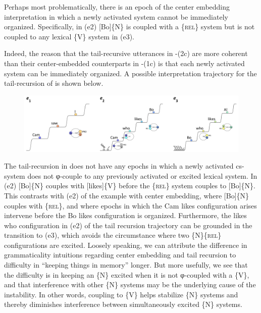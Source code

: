   Perhaps most problematically, there is an epoch of the center embedding interpretation in which a newly activated system cannot be immediately organized. Specifically, in (e2) [Bo]\{N\} is coupled with a \{\textsc{rel}\} system but is not coupled to any lexical \{V\} system in (e3). 

  Indeed, the reason that the tail-recursive utterances in -(2c) are more coherent than their center-embedded counterparts in -(1c) is that each newly activated system can be immediately organized. A possible interpretation trajectory for the tail-recursion of  is shown below. 

  
\begin{figure}
\includegraphics[width=\textwidth]{figures/Tilsen-img133.png}
\caption{\missingcaption}
\label{fig:6:14}
\end{figure}
 

  The tail-recursion in  does not have any epochs in which a newly activated cs-system does not φ-couple to any previously activated or excited lexical system. In (e2) [Bo]\{N\} couples with [likes]\{V\} before the \{\textsc{rel}\} system couples to [Bo]\{N\}. This contrasts with (e2) of the example  with center embedding, where [Bo]\{N\} couples with \{\textsc{rel}\}, and where epochs in which the {\textbar}Cam likes{\textbar} configuration arises intervene before the {\textbar}Bo likes{\textbar} configuration is organized. Furthermore, the {\textbar}likes who{\textbar} configuration in (e2) of the tail recursion trajectory can be grounded in the transition to (e3), which avoids the circumstance where two \{N\}\{\textsc{rel}\} configurations are excited. Loosely speaking, we can attribute the difference in grammaticality intuitions regarding center embedding and tail recursion to difficulty in “keeping things in memory” longer. But more usefully, we see that the difficulty is in keeping an \{N\} excited when it is not φ-coupled with a \{V\}, and that interference with other \{N\} systems may be the underlying cause of the instability. In other words, coupling to \{V\} helps stabilize \{N\} systems and thereby diminishes interference between simultaneously excited \{N\} systems.


